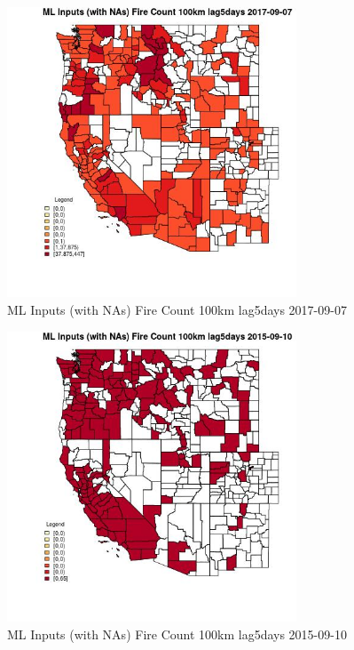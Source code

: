 \begin{figure} 
\centering  
\includegraphics[width=0.77\textwidth]{Code_Outputs/Report_ML_input_PM25_Step4_part_e_de_duplicated_aves_compiled_2019-05-21wNAs_CountyFire_Count_100km_lag5daysMean2017-09-07.jpg} 
\caption{\label{fig:Report_ML_input_PM25_Step4_part_e_de_duplicated_aves_compiled_2019-05-21wNAsCountyFire_Count_100km_lag5daysMean2017-09-07}ML Inputs (with NAs) Fire Count 100km lag5days 2017-09-07} 
\end{figure} 
 

\begin{figure} 
\centering  
\includegraphics[width=0.77\textwidth]{Code_Outputs/Report_ML_input_PM25_Step4_part_e_de_duplicated_aves_compiled_2019-05-21wNAs_CountyFire_Count_100km_lag5daysMean2015-09-10.jpg} 
\caption{\label{fig:Report_ML_input_PM25_Step4_part_e_de_duplicated_aves_compiled_2019-05-21wNAsCountyFire_Count_100km_lag5daysMean2015-09-10}ML Inputs (with NAs) Fire Count 100km lag5days 2015-09-10} 
\end{figure} 
 

